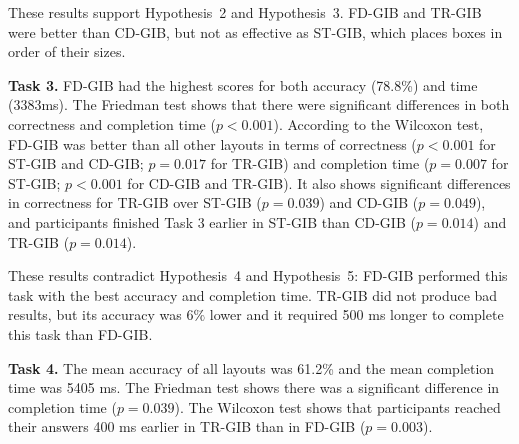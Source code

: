 \documentclass[review]{vgtc}                 %
\begin{document}
These results support Hypothesis~2 and Hypothesis~3. FD-GIB and TR-GIB were better than CD-GIB, but not as effective as ST-GIB, which places boxes in order of their sizes.

{\bf Task 3.} FD-GIB had the highest scores for both accuracy (78.8\%) and time (3383ms).
The Friedman test shows that there were significant differences in both correctness and completion time ($p<0.001$).
According to the Wilcoxon test, FD-GIB was better than all other layouts in terms of correctness ($p<0.001$ for ST-GIB and CD-GIB; $p=0.017$ for TR-GIB) and completion time ($p=0.007$ for ST-GIB; $p<0.001$ for CD-GIB and TR-GIB). It also shows significant differences in correctness for TR-GIB over ST-GIB ($p=0.039$) and CD-GIB ($p=0.049$), and participants finished Task 3 earlier in ST-GIB than CD-GIB ($p=0.014$) and TR-GIB ($p=0.014$).

These results contradict Hypothesis~4 and Hypothesis~5: FD-GIB performed this task with the best accuracy and completion time. TR-GIB did not produce bad results, but its accuracy was $6 \%$ lower and it required 500 ms longer to complete this task than FD-GIB.

{\bf Task 4.} The mean accuracy of all layouts was 61.2\% and the mean completion time was 5405 ms.
The Friedman test shows there was a significant difference in completion time ($p = 0.039$).
The Wilcoxon test shows that participants reached their answers 400 ms earlier in TR-GIB than in FD-GIB ($p=0.003$).



\end{document}
